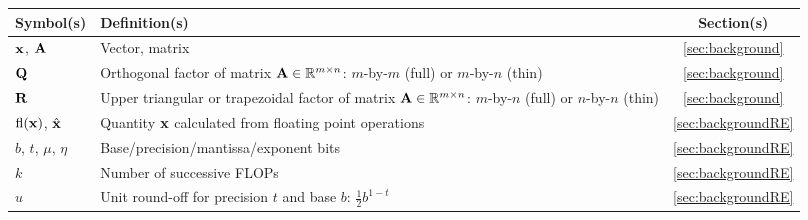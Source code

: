 \begin{table}[h!]
	\centering
	\begin{tabular}{|m{3cm}|m{9cm}|c|}
		\hline
		Symbol(s) & Definition(s) & Section(s) \\ \hline
		${\mathbf{x}}$, ${\mathbf{A}}$  & Vector, matrix  & \ref{sec:background} \\
		\hline
		$\mathbf{Q}$  & Orthogonal factor of matrix $\mathbf{A}\in\mathbb{R}^{m\times n}$: $m$-by-$m$ (full) or $m$-by-$n$ (thin)  & \ref{sec:background}\\
		$\mathbf{R}$ & Upper triangular or trapezoidal factor of matrix $\mathbf{A}\in\mathbb{R}^{m\times n}$:  $m$-by-$n$ (full) or $n$-by-$n$ (thin)  &  \ref{sec:background}\\ 
		\hline
		$\mathrm{fl}(\mathbf{x})$, $\hat{\mathbf{x}}$ & Quantity $\mathbf{x}$ calculated from floating point operations & \ref{sec:backgroundRE} \\
		$b$, $t$, $\mu$, $\eta$  & Base/precision/mantissa/exponent bits & \ref{sec:backgroundRE} \\
		$k$ & Number of successive FLOPs &  \ref{sec:backgroundRE}\\
		$u$ & Unit round-off for precision $t$ and base $b$: $\frac{1}{2}b^{1-t}$ & \ref{sec:backgroundRE} \\ 

\end{tabular}
\end{table}
